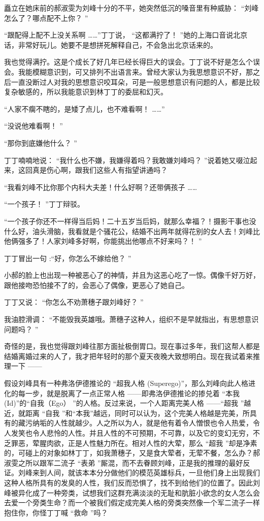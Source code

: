 \documentclass[12pt,twoside,openany]{book}
\begin{document}
矗立在她床前的郝淑雯为刘峰十分的不平，她突然低沉的嗓音里有种威胁： “刘峰怎么了？哪点配不上你？ ”

“跟配得上配不上没关系啊 ……”丁丁说， “这都满拧了！ ”她的上海口音说北京话，非常好玩儿。她要不是想拼死解释自己，不会急出北京话来的。

我也觉得满拧。这是个成长了好几年已经长得巨大的误会。丁丁说不好是怎么个误会。我能模糊意识到，可又排列不出语言来。曾经大家认为我思想意识不好，那之后一直没断过人对我的思想意识咬耳朵，可是一般思想意识有问题的人，都是比较复杂敏感的，所以我能意识到林丁丁的委屈和幻灭。

“人家不瘸不瞎的，是矮了点儿，也不难看啊！ ……”

“没说他难看啊！ ”

“那你到底嫌他什么？ ”

丁丁喃喃地说： “我什么也不嫌，我嫌得着吗？我敢嫌刘峰吗？ ”说着她又啜泣起来，这回真是伤心啊，跟我们这些人有指望讲通吗？

“我看刘峰不比你那个内科大夫差！什么好啊？还带俩孩子 ……

“一个孩子！ ”丁丁辩驳。

“一个孩子你还不一样得当后妈！二十五岁当后妈，就那么幸福？！摄影干事也没什么好，油头滑脑，我看就是个骚花公，结婚不出两年就得花别的女人去！刘峰比他俩强多了！人家刘峰多好啊，你能挑出他哪点不好来吗？！ ”

丁丁冒出一句 :“好，你怎么不嫁给他？ ”

小郝的脸上也出现一种被恶心了的神情，并且为这恶心吃了一惊。偶像千好万好，跟他接吻恐怕接不了的，会恶心了偶像，更恶心了她自己。

丁丁又说： “你怎么不劝萧穗子跟刘峰好？ ”

我油腔滑调： “不能毁我英雄哦。萧穗子这种人，组织不是早就指出，有思想意识问题吗？ ”

奇怪的是，我也觉得跟刘峰往那方面扯极倒胃口。现在事过多年，我们这帮人都是结婚离婚过来的人了，我才把年轻时的那个夏天夜晚大致想明白。现在我试着来推理一下 ——

假设刘峰具有一种弗洛伊德推论的 “超我人格 (Superego)”，那么刘峰向此人格进化的每一步，就是脱离了一点正常人格 ——即弗洛伊德推论的掺兑着 “本我(Id)”的“自我（Ego） ”的人格。反过来说，一个人距离完美人格 ——“超我 ”越近，就距离 “自我 ”和“本我”越远，同时可以认为，这个完美人格越是完美，所具有的藏污纳垢的人性就越少。人之所以为人，就是他有着令人憎恨也令人热爱，令人发笑也令人悲怜的人性。并且人性的不可预期，不可靠，以及它的变幻无穷，不乏罪恶，荤腥肉欲，正是人性魅力所在。相对人性的大荤，那么 “超我 ”却是净素的，可碰上的对象如林丁丁，如我萧穗子，又是食大荤者，无荤不餐，怎么办？郝淑雯之所以跟军二流子 “表弟 ”厮混，而不去眷顾刘峰，正是我的推理的最好反证。刘峰来到人间，就该本本分分做他们的模范英雄标兵，一旦他们身上出现我们这种人格所具有的发臭的人性，我们反而恐惧了，找不到给他们的位置了。因此刘峰被异化成了一种旁类，试想我们这群充满淡淡的无耻和肮脏小欲念的女人怎么会去爱一个旁类生命？而一个被我们假定成完美人格的旁类突然像一个军二流子一样抱住你，你怪丁丁喊 “救命 ”吗？
\end{document}
